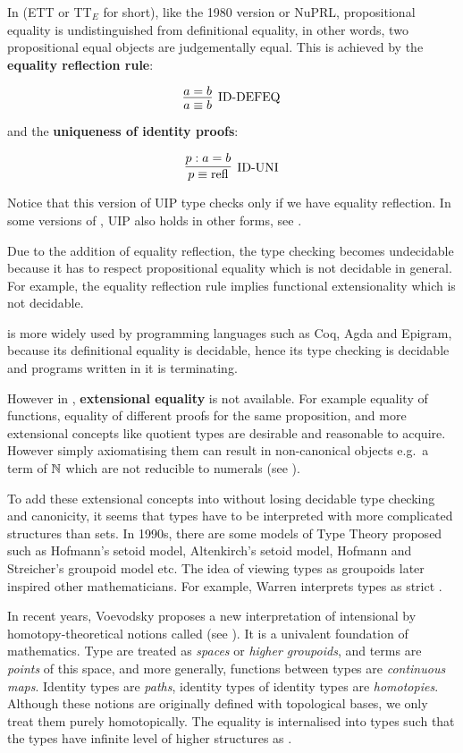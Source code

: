 In \ett (ETT or TT$_E$ for short), like the 1980 version \cite{martin1984intuitionistic} or NuPRL, propositional equality is undistinguished from definitional equality, in other words, two propositional equal objects are judgementally equal. This is achieved by the \textbf{equality reflection rule}:

\begin{equation}
\label{reflection}
\infer[\text{ID-DEFEQ}]{a \equiv b}{a = b}
\end{equation}

and the \textbf{uniqueness of identity proofs}:

\begin{equation}
\label{ID-Uni}
\infer[\text{ID-UNI}]{p \equiv \text{refl}}{p : a = b}
\end{equation}

Notice that this version of UIP type checks only if we have equality reflection. In some versions of \itt, UIP also holds in other forms, see . 

Due to the addition of equality reflection, the type checking becomes undecidable because it has to respect propositional equality which is not decidable in general. For example, the equality reflection rule implies functional extensionality which is not decidable.

\itt is more widely used by programming languages such as Coq, Agda and Epigram, because its definitional equality is decidable, hence its type checking is decidable and programs written in it is terminating.

However in \itt, \textbf{extensional equality} is not available. For example equality of functions, equality of different proofs for the same proposition, and more extensional concepts like quotient types are desirable and reasonable to acquire. However simply axiomatising them can result in non-canonical objects e.g.\ a term of $\mathbb{N}$ which are not reducible to numerals (see ). 


To add these extensional concepts into \itt without losing decidable type checking and canonicity, it seems that types have to be interpreted with more complicated structures than sets.
In 1990s, there are some models of Type Theory proposed such as Hofmann's setoid model, Altenkirch's setoid model, Hofmann and Streicher's groupoid model etc.
The idea of viewing types as groupoids later inspired other mathematicians. For example, Warren \cite{Warren} interprets types as strict \og.

In recent years, Voevodsky proposes a new interpretation of intensional \mltt by homotopy-theoretical notions \cite{klv:ssetmodel,voe:06} called \hott (see ). It is a univalent foundation of mathematics. 
Type are treated as \emph{spaces} or \emph{higher groupoids}, and terms are \emph{points} of this space, and more generally, functions between types are \emph{continuous maps}. Identity types are \emph{paths}, identity types of identity types are \emph{homotopies}. Although these notions are originally defined with topological bases, we only treat them purely homotopically. The equality is internalised into types such that the types have infinite level of higher structures as \wog.


